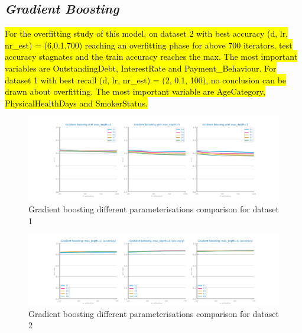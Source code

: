 \documentclass[10pt]{extarticle}
\newcommand{\ctext}[3][RGB]{%
  \begingroup
  \definecolor{hlcolor}{#1}{#2}\sethlcolor{hlcolor}%
  \hl{#3}%
  \endgroup
}
\begin{document}
\subsection*{\textit{Gradient Boosting}}
\ctext[RGB]{190,190,190}{For the overfitting study of this model, on dataset 2 with best accuracy (d, lr, nr\_est) = (6,0.1,700) reaching an overfitting phase for above 700 iterators, test accuracy stagnates and the train accuracy reaches the max. The most important variables are OutstandingDebt, InterestRate and Payment\_Behaviour.
For dataset 1 with best recall (d, lr, nr\_est) = (2, 0.1, 100), no conclusion can be drawn about overfitting. The most important variable are AgeCategory, PhysicalHealthDays and SmokerStatus.  }
\begin{figure}[H]
\centering\includegraphics[scale=0.60]{images/dataset1/models_evaluation/CovidPos_gb_recall_study.png}
\caption{Gradient boosting different parameterisations comparison for dataset 1}
\end{figure}

\begin{figure}[H]
\centering\includegraphics[scale=0.60]{images/dataset2/models_evaluation/Credit_Score_gb_study.png}
\caption{Gradient boosting different parameterisations comparison for dataset 2}
\end{figure}
\end{document}

